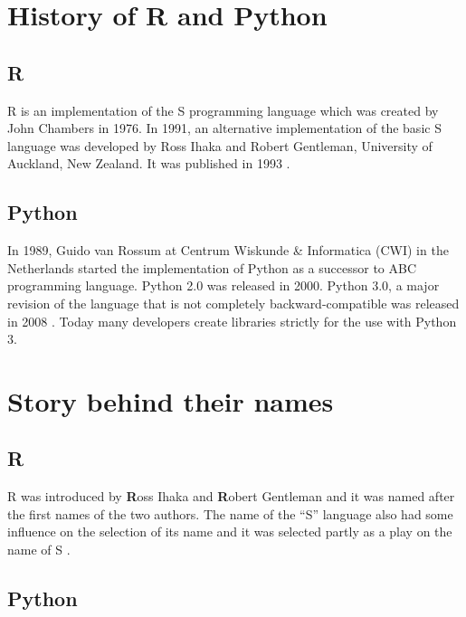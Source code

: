 \documentclass[]{book}
\begin{document}
\hypertarget{history-of-r-and-python}{%
\section{History of R and Python}\label{history-of-r-and-python}}

\hypertarget{r-1}{%
\subsection{R}\label{r-1}}

R is an implementation of the S programming language which was created by John Chambers in 1976. In 1991, an alternative implementation of the basic S language was developed by Ross Ihaka and Robert Gentleman, University of Auckland, New Zealand. It was published in 1993 \citep{wikiR}.

\hypertarget{python-1}{%
\subsection{Python}\label{python-1}}

In 1989, Guido van Rossum at Centrum Wiskunde \& Informatica (CWI) in the Netherlands started the implementation of Python as a successor to ABC programming language. Python 2.0 was released in 2000. Python 3.0, a major revision of the language that is not completely backward-compatible was released in 2008 \citep{wikipython} . Today many developers create libraries strictly for the use with Python 3.

\hypertarget{story-behind-their-names}{%
\section{Story behind their names}\label{story-behind-their-names}}

\hypertarget{r-2}{%
\subsection{R}\label{r-2}}

R was introduced by \textbf{R}oss Ihaka and \textbf{R}obert Gentleman and it was named after the first names of the two authors. The name of the ``S'' language also had some influence on the selection of its name and it was selected partly as a play on the name of S \citep{wikiR}.

\hypertarget{python-2}{%
\subsection{Python}\label{python-2}}
\end{document}
